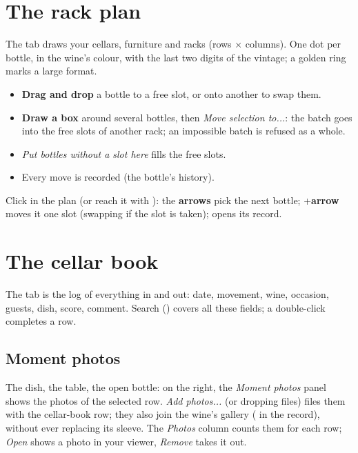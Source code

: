 \documentclass[11pt,a4paper]{article}
\begin{document}

\section{The rack plan}
The  tab draws your cellars, furniture and racks (rows × columns). One dot per bottle, in the
wine's colour, with the last two digits of the vintage; a golden ring marks a large format.
\begin{itemize}
  \item \textbf{Drag and drop} a bottle to a free slot, or onto another to swap them.
  \item \textbf{Draw a box} around several bottles, then \emph{Move selection to...}: the batch goes into
        the free slots of another rack; an impossible batch is refused as a whole.
  \item \emph{Put bottles without a slot here} fills the free slots.
  \item Every move is recorded (the bottle's history).
\end{itemize}


\begin{clavier}
Click in the plan (or reach it with ): the \textbf{arrows} pick the next bottle;
+\textbf{arrow} moves it one slot (swapping if the slot is taken);  opens its
record.
\end{clavier}

\section{The cellar book}
The  tab is the log of everything in and out: date, movement, wine, occasion, guests, dish,
score, comment. Search () covers all these fields; a double-click completes a row.

\subsection{Moment photos}
The dish, the table, the open bottle: on the right, the \emph{Moment photos} panel shows the photos of the
selected row. \emph{Add photos...} (or dropping files) files them with the cellar-book row; they also join
the wine's gallery ( in the record), without ever replacing its sleeve. The \emph{Photos}
column counts them for each row; \emph{Open} shows a photo in your viewer, \emph{Remove} takes it out.
\end{document}
